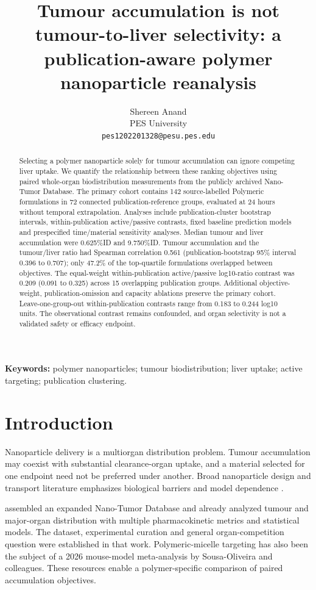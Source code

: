 \documentclass[11pt]{article}
\title{Tumour accumulation is not tumour-to-liver selectivity: a publication-aware polymer nanoparticle reanalysis}
\author{Shereen Anand \\ PES University \\ \texttt{pes1202201328@pesu.pes.edu}}
\begin{document}
\raggedbottom
\maketitle
\begin{abstract}
Selecting a polymer nanoparticle solely for tumour accumulation can ignore competing liver uptake. We quantify the relationship between these ranking objectives using paired whole-organ biodistribution measurements from the publicly archived Nano-Tumor Database. The primary cohort contains 142 source-labelled Polymeric formulations in 72 connected publication-reference groups, evaluated at 24 hours without temporal extrapolation. Analyses include publication-cluster bootstrap intervals, within-publication active/passive contrasts, fixed baseline prediction models and prespecified time/material sensitivity analyses. Median tumour and liver accumulation were 0.625\%ID and 9.750\%ID. Tumour accumulation and the tumour/liver ratio had Spearman correlation 0.561 (publication-bootstrap 95\% interval 0.396 to 0.707); only 47.2\% of the top-quartile formulations overlapped between objectives. The equal-weight within-publication active/passive log10-ratio contrast was 0.209 (0.091 to 0.325) across 15 overlapping publication groups. Additional objective-weight, publication-omission and capacity ablations preserve the primary cohort. Leave-one-group-out within-publication contrasts range from 0.183 to 0.244 log10 units. The observational contrast remains confounded, and organ selectivity is not a validated safety or efficacy endpoint.
\end{abstract}
\textbf{Keywords:} polymer nanoparticles; tumour biodistribution; liver uptake; active targeting; publication clustering.

\section{Introduction}
Nanoparticle delivery is a multiorgan distribution problem. Tumour accumulation may coexist with substantial clearance-organ uptake, and a material selected for one endpoint need not be preferred under another. Broad nanoparticle design and transport literature emphasizes biological barriers and model dependence \citep{ref78be280f5a7c,ref15e4cde02490,ref0599982c3182}.

\citet{ref32ce5d18e6e9} assembled an expanded Nano-Tumor Database and already analyzed tumour and major-organ distribution with multiple pharmacokinetic metrics and statistical models. The dataset, experimental curation and general organ-competition question were established in that work. Polymeric-micelle targeting has also been the subject of a 2026 mouse-model meta-analysis by Sousa-Oliveira and colleagues. These resources enable a polymer-specific comparison of paired accumulation objectives.
\end{document}
